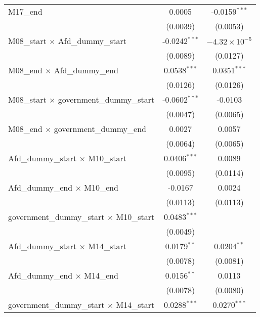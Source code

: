 \documentclass[10pt,a4paper]{article}
\begin{document}
\begin{tabular}{lcc}
   M17\_end                                         & 0.0005          & -0.0159$^{***}$\\   
                                                    & (0.0039)        & (0.0053)\\   
   M08\_start $\times$ Afd\_dummy\_start            & -0.0242$^{***}$ & $-4.32\times 10^{-5}$\\    
                                                    & (0.0089)        & (0.0127)\\   
   M08\_end $\times$ Afd\_dummy\_end                & 0.0538$^{***}$  & 0.0351$^{***}$\\   
                                                    & (0.0126)        & (0.0126)\\   
   M08\_start $\times$ government\_dummy\_start     & -0.0602$^{***}$ & -0.0103\\   
                                                    & (0.0047)        & (0.0065)\\   
   M08\_end $\times$ government\_dummy\_end         & 0.0027          & 0.0057\\   
                                                    & (0.0064)        & (0.0065)\\   
   Afd\_dummy\_start $\times$ M10\_start            & 0.0406$^{***}$  & 0.0089\\   
                                                    & (0.0095)        & (0.0114)\\   
   Afd\_dummy\_end $\times$ M10\_end                & -0.0167         & 0.0024\\   
                                                    & (0.0113)        & (0.0113)\\   
   government\_dummy\_start $\times$ M10\_start     & 0.0483$^{***}$  &   \\   
                                                    & (0.0049)        &   \\   
   Afd\_dummy\_start $\times$ M14\_start            & 0.0179$^{**}$   & 0.0204$^{**}$\\   
                                                    & (0.0078)        & (0.0081)\\   
   Afd\_dummy\_end $\times$ M14\_end                & 0.0156$^{**}$   & 0.0113\\   
                                                    & (0.0078)        & (0.0080)\\   
   government\_dummy\_start $\times$ M14\_start     & 0.0288$^{***}$  & 0.0270$^{***}$\\   

\end{tabular}
\end{document}
